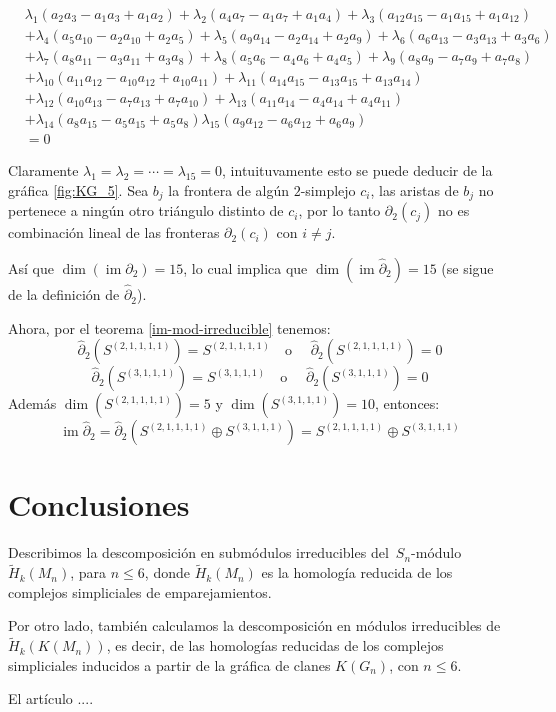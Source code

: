 \documentclass[12pt]{book}
\theoremstyle{definition}
\DeclareMathOperator{\im}{im}
\newcounter{in}
\newcounter{ini}
\begin{document}
\begin{footnotesize}
  \begin{align*}
    &\lambda_{1}(a_{2}a_{3}-a_{1}a_{3}+a_{1}a_{2})+\lambda_{2}(a_{4}a_{7}-a_{1}a_{7}+a_{1}a_{4})+\lambda_{3}(a_{12}a_{15}-a_{1}a_{15}+a_{1}a_{12})\\
    &+\lambda_{4}(a_{5}a_{10}-a_{2}a_{10}+a_{2}a_{5})+\lambda_{5}(a_{9}a_{14}-a_{2}a_{14}+a_{2}a_{9})+\lambda_{6}(a_{6}a_{13}-a_{3}a_{13}+a_{3}a_{6})\\
    &+\lambda_{7}(a_{8}a_{11}-a_{3}a_{11}+a_{3}a_{8})+\lambda_{8}(a_{5}a_{6}-a_{4}a_{6}+a_{4}a_{5})+\lambda_{9}(a_{8}a_{9}-a_{7}a_{9}+a_{7}a_{8})\\
    &+\lambda_{10}(a_{11}a_{12}-a_{10}a_{12}+a_{10}a_{11})+\lambda_{11}(a_{14}a_{15}-a_{13}a_{15}+a_{13}a_{14})\\
    &+\lambda_{12}(a_{10}a_{13}-a_{7}a_{13}+a_{7}a_{10})+\lambda_{13}(a_{11}a_{14}-a_{4}a_{14}+a_{4}a_{11})\\
    &+\lambda_{14}(a_{8}a_{15}-a_{5}a_{15}+a_{5}a_{8})\lambda_{15}(a_{9}a_{12}-a_{6}a_{12}+a_{6}a_{9})\\
    &=0
  \end{align*}
\end{footnotesize}

Claramente $\lambda_{1}=\lambda_{2}=\cdots=\lambda_{15}=0$,
intuituvamente esto se puede deducir de la gráfica \ref{fig:KG_5}.
Sea $b_{j}$ la frontera de algún $2$-simplejo $c_{i}$, las aristas
de $b_{j}$ no pertenece a ningún otro triángulo distinto de $c_{i}$, por
lo tanto $\partial_{2}(c_{j})$ no es combinación lineal de las fronteras
$\partial_{2}(c_{i})$ con $i\neq j$.

Así que $\dim(\im\partial_{2})=15$, lo cual implica que
$\dim(\im\widehat\partial_{2})=15$ (se sigue de la definición de
$\widehat\partial_{2}$).

Ahora, por el teorema \ref{im-mod-irreducible} tenemos:
  $$\widehat\partial_{2}(S^{(2,1,1,1,1)})=S^{(2,1,1,1,1)} \quad \mbox{o }\quad \widehat\partial_{2}(S^{(2,1,1,1,1)})=0$$
  $$\widehat\partial_{2}(S^{(3,1,1,1)})=S^{(3,1,1,1)} \quad \mbox{o }\quad \widehat\partial_{2}(S^{(3,1,1,1)})=0$$
Además $\dim(S^{(2,1,1,1,1)})=5$ y $\dim(S^{(3,1,1,1)})=10$, entonces:
$$\im\widehat\partial_{2}=\widehat\partial_{2}(S^{(2,1,1,1,1)}\oplus S^{(3,1,1,1)})=S^{(2,1,1,1,1)}\oplus S^{(3,1,1,1)}$$

\chapter*{Conclusiones}
 
Describimos la descomposición en submódulos irreducibles del~$S_{n}$-módulo~$\widetilde H_{k}(M_{n})$, para $n\leq 6$, donde $\widetilde
H_{k}(M_{n})$ es la homología reducida de los complejos simpliciales
de emparejamientos.

Por otro lado, también calculamos la descomposición en módulos
irreducibles de $\widetilde H_{k}(K(M_{n}))$, es decir, de las
homologías reducidas de los complejos simpliciales inducidos a partir
de la gráfica de clanes $K(G_{n})$, con $n\leq 6$.

El artículo \cite{larrion2009clique}....




\printindex
\end{document}
